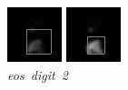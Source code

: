 \documentclass{article} %
\begin{document}
\begin{figure}[t]
  \includegraphics[width=\linewidth]{figures/9-2-4.png}
  \caption{\mbox{\textit{eos digit 2}}}
\endminipage\hfill
{}
  \includegraphics[width=\linewidth]{figures/9-2-6.png}

\end{figure}
\end{document}
